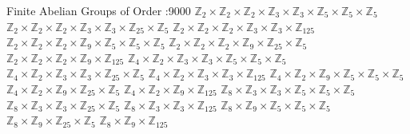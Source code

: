 \documentclass[12pt,letterpaper,boxed]{maths_v5}
\begin{document}
\begin{center}
Finite Abelian Groups of Order :9000\newline 
$\mathbb{Z}_{2}\times \mathbb{Z}_{2}\times \mathbb{Z}_{2}\times \mathbb{Z}_{3}\times \mathbb{Z}_{3}\times \mathbb{Z}_{5}\times \mathbb{Z}_{5}\times \mathbb{Z}_{5}$ \newline
$\mathbb{Z}_{2}\times \mathbb{Z}_{2}\times \mathbb{Z}_{2}\times \mathbb{Z}_{3}\times \mathbb{Z}_{3}\times \mathbb{Z}_{25}\times \mathbb{Z}_{5}$ \newline
$\mathbb{Z}_{2}\times \mathbb{Z}_{2}\times \mathbb{Z}_{2}\times \mathbb{Z}_{3}\times \mathbb{Z}_{3}\times \mathbb{Z}_{125}$ \newline
$\mathbb{Z}_{2}\times \mathbb{Z}_{2}\times \mathbb{Z}_{2}\times \mathbb{Z}_{9}\times \mathbb{Z}_{5}\times \mathbb{Z}_{5}\times \mathbb{Z}_{5}$ \newline
$\mathbb{Z}_{2}\times \mathbb{Z}_{2}\times \mathbb{Z}_{2}\times \mathbb{Z}_{9}\times \mathbb{Z}_{25}\times \mathbb{Z}_{5}$ \newline
$\mathbb{Z}_{2}\times \mathbb{Z}_{2}\times \mathbb{Z}_{2}\times \mathbb{Z}_{9}\times \mathbb{Z}_{125}$ \newline
$\mathbb{Z}_{4}\times \mathbb{Z}_{2}\times \mathbb{Z}_{3}\times \mathbb{Z}_{3}\times \mathbb{Z}_{5}\times \mathbb{Z}_{5}\times \mathbb{Z}_{5}$ \newline
$\mathbb{Z}_{4}\times \mathbb{Z}_{2}\times \mathbb{Z}_{3}\times \mathbb{Z}_{3}\times \mathbb{Z}_{25}\times \mathbb{Z}_{5}$ \newline
$\mathbb{Z}_{4}\times \mathbb{Z}_{2}\times \mathbb{Z}_{3}\times \mathbb{Z}_{3}\times \mathbb{Z}_{125}$ \newline
$\mathbb{Z}_{4}\times \mathbb{Z}_{2}\times \mathbb{Z}_{9}\times \mathbb{Z}_{5}\times \mathbb{Z}_{5}\times \mathbb{Z}_{5}$ \newline
$\mathbb{Z}_{4}\times \mathbb{Z}_{2}\times \mathbb{Z}_{9}\times \mathbb{Z}_{25}\times \mathbb{Z}_{5}$ \newline
$\mathbb{Z}_{4}\times \mathbb{Z}_{2}\times \mathbb{Z}_{9}\times \mathbb{Z}_{125}$ \newline
$\mathbb{Z}_{8}\times \mathbb{Z}_{3}\times \mathbb{Z}_{3}\times \mathbb{Z}_{5}\times \mathbb{Z}_{5}\times \mathbb{Z}_{5}$ \newline
$\mathbb{Z}_{8}\times \mathbb{Z}_{3}\times \mathbb{Z}_{3}\times \mathbb{Z}_{25}\times \mathbb{Z}_{5}$ \newline
$\mathbb{Z}_{8}\times \mathbb{Z}_{3}\times \mathbb{Z}_{3}\times \mathbb{Z}_{125}$ \newline
$\mathbb{Z}_{8}\times \mathbb{Z}_{9}\times \mathbb{Z}_{5}\times \mathbb{Z}_{5}\times \mathbb{Z}_{5}$ \newline
$\mathbb{Z}_{8}\times \mathbb{Z}_{9}\times \mathbb{Z}_{25}\times \mathbb{Z}_{5}$ \newline
$\mathbb{Z}_{8}\times \mathbb{Z}_{9}\times \mathbb{Z}_{125}$ \newline
\end{center}
\end{document}
